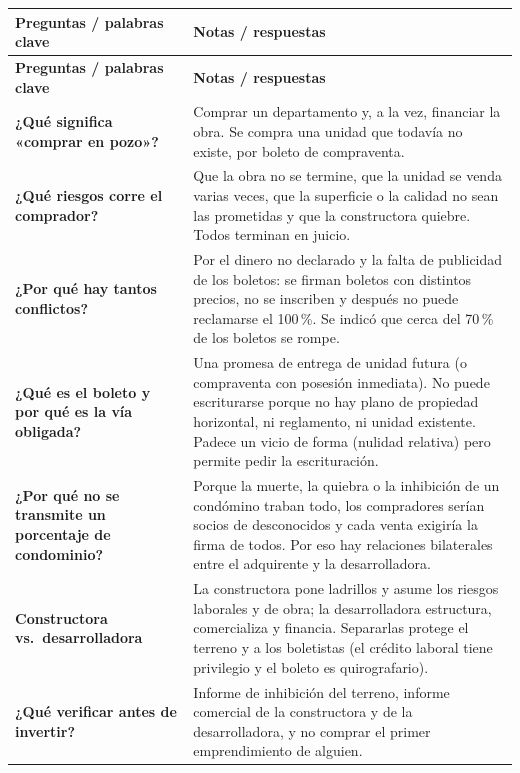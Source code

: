 \documentclass[12pt,oneside]{book}
\begin{document}
\begin{longtable}{p{}p{}}
\toprule
\textbf{Preguntas / palabras clave} & \textbf{Notas / respuestas} \\
\midrule
\endfirsthead
\toprule
\textbf{Preguntas / palabras clave} & \textbf{Notas / respuestas} \\
\midrule
\endhead

\textbf{¿Qué significa «comprar en pozo»?} &
Comprar un departamento y, a la vez, financiar la obra. Se compra una unidad que todavía no existe, por boleto de compraventa. \\[0.6em]

\textbf{¿Qué riesgos corre el comprador?} &
Que la obra no se termine, que la unidad se venda varias veces, que la superficie o la calidad no sean las prometidas y que la constructora quiebre. Todos terminan en juicio. \\[0.6em]

\textbf{¿Por qué hay tantos conflictos?} &
Por el dinero no declarado y la falta de publicidad de los boletos: se firman boletos con distintos precios, no se inscriben y después no puede reclamarse el 100\,\%. Se indicó que cerca del 70\,\% de los boletos se rompe. \\[0.6em]

\textbf{¿Qué es el boleto y por qué es la vía obligada?} &
Una promesa de entrega de unidad futura (o compraventa con posesión inmediata). No puede escriturarse porque no hay plano de propiedad horizontal, ni reglamento, ni unidad existente. Padece un vicio de forma (nulidad relativa) pero permite pedir la escrituración. \\[0.6em]

\textbf{¿Por qué no se transmite un porcentaje de condominio?} &
Porque la muerte, la quiebra o la inhibición de un condómino traban todo, los compradores serían socios de desconocidos y cada venta exigiría la firma de todos. Por eso hay relaciones bilaterales entre el adquirente y la desarrolladora. \\[0.6em]

\textbf{Constructora vs.\ desarrolladora} &
La constructora pone ladrillos y asume los riesgos laborales y de obra; la desarrolladora estructura, comercializa y financia. Separarlas protege el terreno y a los boletistas (el crédito laboral tiene privilegio y el boleto es quirografario). \\[0.6em]

\textbf{¿Qué verificar antes de invertir?} &
Informe de inhibición del terreno, informe comercial de la constructora y de la desarrolladora, y no comprar el primer emprendimiento de alguien. \\


\end{longtable}
\end{document}
